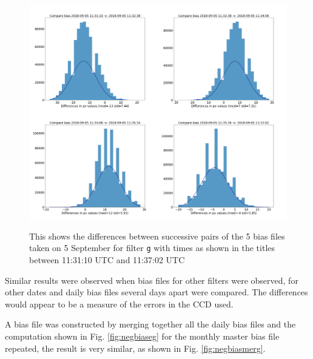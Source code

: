 \begin{figure}[!htbp]
\begin{center}
\includegraphics[scale=0.2]{images/biascomp.png}
\end{center}   
\caption{This shows the differences between successive pairs of the 5 bias
files taken on 5 September for filter \texttt{g} with times as shown in the
titles between 11:31:10 UTC and 11:37:02 UTC} \protect\label{fig:biascomp}
\end{figure}

Similar results were observed when bias files for other filters were observed,
for other dates and daily bias files several days apart were compared. The
differences would appear to be a measure of the errors in the CCD used.

A bias file was constructed by merging together all the daily bias files and the
computation shown in Fig. \ref{fig:negbiaseg} for the monthly master
bias file repeated, the result is very similar, as shown in Fig.
\ref{fig:negbiasmerg}.

